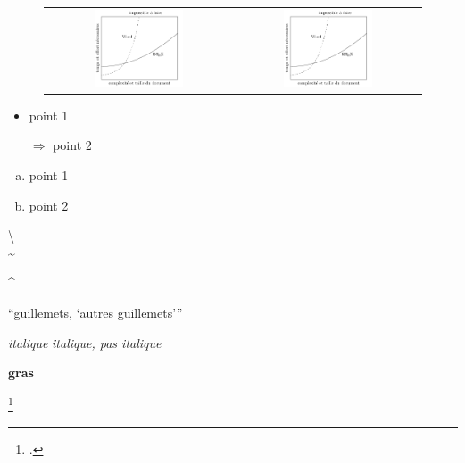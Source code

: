 \documentclass[a4paper, 10pt]{article}\usepackage[]{graphicx}\usepackage[]{xcolor}
\begin{document}
 \begin{figure}[!ht]
  \begin{tabular}{cc}
    \includegraphics[width=0.5\textwidth]{Images/latex_word.png} & \includegraphics[width=0.5\textwidth]{Images/latex_word.png} \\
    \end{tabular}
 \end{figure}

\begin{itemize}
  \item point 1
  \item[$\Rightarrow$] point 2
\end{itemize}

\begin{enumerate}[(a)]%
  \item point 1
  \item point 2
\end{enumerate}

\textbackslash\\
\textasciitilde

\textasciicircum

\enquote{guillemets, \enquote{autres guillemets}}

\textit{italique}
\emph{italique, \emph{pas italique}}

\textbf{gras}


\cite{Rouquette2011}\footcite{Rouquette2011}
\nocite{Rouquette2011}
\nocite{*}
\end{document}
